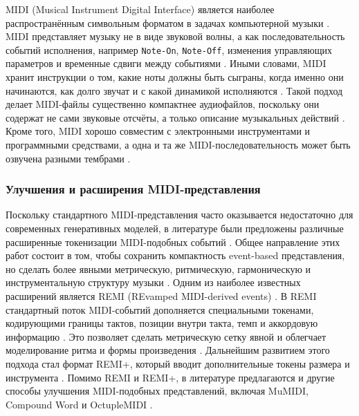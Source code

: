 \documentclass[a4paper,12pt]{extarticle}
\begin{document}
MIDI (Musical Instrument Digital Interface) является наиболее распространённым символьным форматом в задачах компьютерной музыки \cite{briot2017deep,duan2025recent,ji2020comprehensive}. 
MIDI представляет музыку не в виде звуковой волны, а как последовательность событий исполнения, например \texttt{Note-On}, \texttt{Note-Off}, изменения управляющих параметров и временные сдвиги между событиями \cite{briot2017deep,duan2025recent}. 
Иными словами, MIDI хранит инструкции о том, какие ноты должны быть сыграны, когда именно они начинаются, как долго звучат и с какой динамикой исполняются \cite{duan2025recent,briot2017deep}. 
Такой подход делает MIDI-файлы существенно компактнее аудиофайлов, поскольку они содержат не сами звуковые отсчёты, а только описание музыкальных действий \cite{duan2025recent}. 
Кроме того, MIDI хорошо совместим с электронными инструментами и программными средствами, а одна и та же MIDI-последовательность может быть озвучена разными тембрами \cite{duan2025recent,briot2017deep}. 

\subsubsection{Улучшения и расширения MIDI-представления}
\label{subsubsec:midi_extensions}

Поскольку стандартного MIDI-представления часто оказывается недостаточно для современных генеративных моделей, в литературе были предложены различные расширенные токенизации MIDI-подобных событий \cite{duan2025recent,ji2023symbolic}. 
Общее направление этих работ состоит в том, чтобы сохранить компактность event-based представления, но сделать более явными метрическую, ритмическую, гармоническую и инструментальную структуру музыки \cite{ji2023symbolic,duan2025recent}. 
Одним из наиболее известных расширений является REMI (REvamped MIDI-derived events) \cite{ji2023symbolic,duan2025recent}. 
В REMI стандартный поток MIDI-событий дополняется специальными токенами, кодирующими границы тактов, позиции внутри такта, темп и аккордовую информацию \cite{ji2023symbolic,duan2025recent}. 
Это позволяет сделать метрическую сетку явной и облегчает моделирование ритма и формы произведения \cite{ji2023symbolic}. 
Дальнейшим развитием этого подхода стал формат REMI+, который вводит дополнительные токены размера и инструмента \cite{duan2025recent}. 
Помимо REMI и REMI+, в литературе предлагаются и другие способы улучшения MIDI-подобных представлений, включая MuMIDI, Compound Word и OctupleMIDI \cite{ji2023symbolic,duan2025recent}. 
\end{document}
